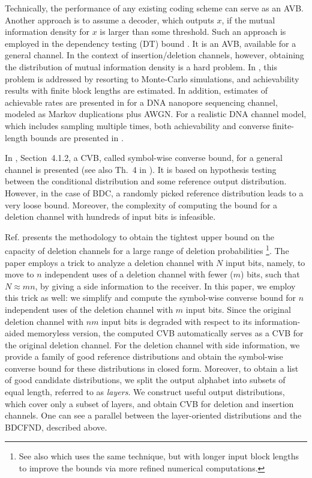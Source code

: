 \documentclass[journal, twocol]{IEEEtran}
\begin{document}
Technically, the performance of any existing coding scheme can serve as an AVB. 
Another approach is to assume a decoder, which outputs $x$, if the mutual information density for $x$ is larger than some threshold.
Such an approach is employed in the dependency testing (DT) bound \cite{polyanskiy2010channel}.
It is an AVB, available for a general channel.
In the context of insertion/deletion channels, however, obtaining the distribution of mutual information density is a hard problem.
In \cite{maarouf23finite}, this problem is addressed by resorting to Monte-Carlo simulations, and achievability results with finite block lengths are estimated. In addition, estimates of achievable rates are presented in \cite{mcbain24information} for a DNA nanopore sequencing channel, modeled as Markov duplications plus AWGN.
For a realistic DNA channel model, which includes sampling multiple times, both achievability and converse finite-length bounds are presented in \cite{weinberger22dna}. 

In \cite{tan15asymptotic}, Section~4.1.2, a CVB, called symbol-wise converse bound, for a general channel is presented (see also Th.~4 in \cite{verdu94general}). 
It is based on hypothesis testing between the conditional distribution and some reference output distribution.
However, in the case of BDC, a randomly picked reference distribution leads to a very loose bound.
Moreover, the complexity of computing the bound for a deletion channel with hundreds of input bits is infeasible.

Ref. \cite{fertonani11upper} presents the methodology to obtain the tightest upper bound on the capacity of deletion channels for a large range of deletion probabilities \footnote{See also \cite{rubinstein2023} which uses the same technique, but with longer input block lengths to improve the bounds via more refined numerical computations.}. The paper employs a trick to analyze a deletion channel with $N$ input bits, namely, to move to $n$ independent uses of a deletion channel with fewer ($m$) bits, such that $N\approx mn$, by giving a side information to the receiver.
In this paper, we employ this trick as well: we simplify and compute the symbol-wise converse bound for $n$ independent uses of the deletion channel with $m$ input bits. 
Since the original deletion channel with $nm$ input bits is degraded with respect to its information-aided memoryless version, the computed CVB automatically serves as a CVB for the original deletion channel. 
For the deletion channel with side information, we provide a family of good reference distributions and obtain the symbol-wise converse bound for these distributions in closed form.
Moreover, to obtain a list of good candidate distributions, we split the output alphabet into subsets of equal length, referred to as \emph{layers}.
We construct useful output distributions, which cover only a subset of layers, and obtain CVB for deletion and insertion channels. 
One can see a parallel between the layer-oriented distributions and the BDCFND, described above.
\end{document}
